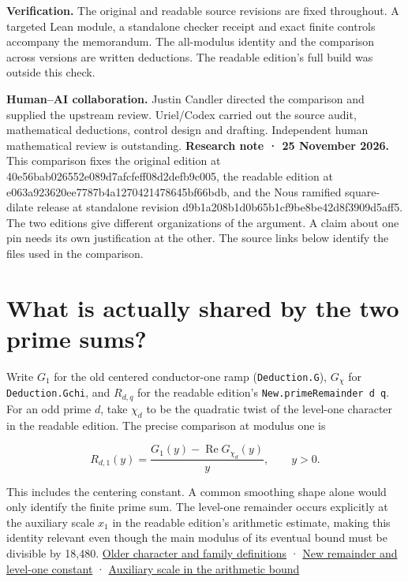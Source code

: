 \documentclass[11pt,letterpaper]{article}
\begin{document}
\medskip\textbf{Verification.} The original and readable source revisions are fixed throughout. A targeted Lean module, a standalone checker receipt and exact finite controls accompany the memorandum. The all-modulus identity and the comparison across versions are written deductions. The readable edition's full build was outside this check.
\medskip\par\textbf{Human--AI collaboration.} Justin Candler directed the comparison and supplied the upstream review. Uriel/Codex carried out the source audit, mathematical deductions, control design and drafting. Independent human mathematical review is outstanding.
\clearpage\tableofcontents
\clearpage{}
\textbf{Research note · 25 November 2026.} This comparison fixes the original edition at {\footnotesize\ttfamily 40e56bab02\allowbreak 6552e089d7af\allowbreak cfeff08d2defb9c005}, the readable edition at {\footnotesize\ttfamily e063a92362\allowbreak 0ee7787b4a12\allowbreak 70421478645bf66bdb}, and the Nous ramified square-dilate release at standalone revision {\footnotesize\ttfamily d9b1a208b1\allowbreak d0b65b1cf9be\allowbreak 8be42d8f3909d5aff5}. The two editions give different organizations of the argument. A claim about one pin needs its own justification at the other. The source links below identify the files used in the comparison.

\section{What is actually shared by the two prime sums?}

Write $G_1$ for the old centered conductor-one ramp (\nolinkurl{Deduction.G}), $G_\chi $ for \nolinkurl{Deduction.Gchi}, and $R_{d,q}$ for the readable edition's \nolinkurl{New.primeRemainder d q}. For an odd prime $d$, take $\chi _d$ to be the quadratic twist of the level-one character in the readable edition. The precise comparison at modulus one is

\[
R_{d,1}(y)=\frac{G_1(y)-\operatorname{Re} G_{\chi _d}(y)}{y},\qquad y>0 .
\]

This includes the centering constant. A common smoothing shape alone would only identify the finite prime sum. The level-one remainder occurs explicitly at the auxiliary scale $x_1$ in the readable edition's arithmetic estimate, making this identity relevant even though the main modulus of its eventual bound must be divisible by 18,480. \href{https://github.com/nousentllc/riemann-hypothesis/blob/40e56bab026552e089d7afcfeff08d2defb9c005/src/Development/AutomorphicArithmetic/DedekindLFunctions/CharFamily.lean}{Older character and family definitions} · \href{https://github.com/nousentllc/riemann-hypothesis/blob/e063a923620ee7787b4a1270421478645bf66bdb/src/New/Reduction/Zeros/PrimeError.lean#L140-L163}{New remainder and level-one constant} · \href{https://github.com/nousentllc/riemann-hypothesis/blob/e063a923620ee7787b4a1270421478645bf66bdb/src/New/Reduction/OneSidedBound.lean#L29-L67}{Auxiliary scale in the arithmetic bound}
\end{document}

